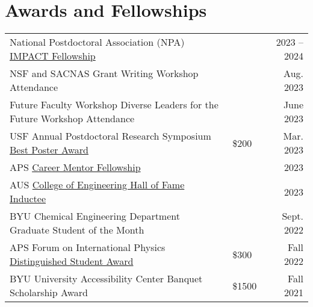 \documentclass[letterpaper,11pt]{article}
\begin{document}
\vspace{-1.4\baselineskip}

\begin{refsection}[nopeer]
  \nocite{*}
  \setlength\bibitemsep{0pt}
  \printbibliography[resetnumbers=true,type=article,title={In Progress Publications},heading=fix]
\end{refsection}

\vspace{-1.4\baselineskip}
\section*{Awards and Fellowships}
\vspace{-0.5\baselineskip}
\begin{longtable}{@{}p{} p{} r@{}}
  National Postdoctoral Association (NPA) \href{https://www.nationalpostdoc.org/general/custom.asp?page=IMPACTProgram}{IMPACT Fellowship} 	& & 2023 -- 2024\\[3.5pt]
  NSF and SACNAS Grant Writing Workshop Attendance                           									& & Aug. 2023 \\[3.5pt]
  Future Faculty Workshop Diverse Leaders for the Future Workshop Attendance 									& & June 2023 \\[3.5pt]
  USF Annual Postdoctoral Research Symposium \href{https://www.usf.edu/postdoctoral-affairs/postdoc-services/postdoc-spotlight.aspx#:~:text=BEST\%20POSTERS\%3A-,Pierre\%20Kawak,-Exploring\%20Mechanisms\%20of}{Best Poster Award}               & \$200 & Mar. 2023 \\[3.5pt]
  APS \href{https://www.aps.org/careers/guidance/mentoring.cfm}{Career Mentor Fellowship}                                               	& & 2023 \\[3.5pt]
  AUS \href{https://www.aus.edu/cen/alumni-hall-of-fame#:~:text=of\%20Technology\%20Sydney-,Dr.\%20Pierre\%20Kawak\%C2\%A0,-BS\%27\%2015\%20\%2D\%20Chemical}{College of Engineering Hall of Fame Inductee}                           & & 2023 \\[3.5pt]
  BYU Chemical Engineering Department Graduate Student of the Month          									& & Sept. 2022 \\[3.5pt]
  APS Forum on International Physics \href{https://engage.aps.org/fip/honors/prizes-awards/ds-program}{Distinguished Student Award}             & \$300 & Fall 2022 \\[3.5pt] %
  BYU University Accessibility Center Banquet Scholarship Award              									& \$1500 & Fall 2021 \\[3.5pt] %

\end{longtable}
\end{document}

